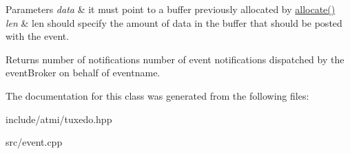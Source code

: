 \begin{DoxyParams}{Parameters}
{\em data} & it must point to a buffer previously allocated by \hyperlink{classatmi_1_1tuxedo_a44e77e3e6216a8c3fb8be33d5d8fed93}{allocate()} \\
\hline
{\em len} & len should specify the amount of data in the buffer that should be posted with the event.\\
\hline
\end{DoxyParams}
\begin{DoxyReturn}{Returns}
number of notifications number of event notifications dispatched by the event\+Broker on behalf of eventname. 
\end{DoxyReturn}


The documentation for this class was generated from the following files\+:\begin{DoxyCompactItemize}
\item 
include/atmi/tuxedo.\+hpp\item 
src/event.\+cpp\end{DoxyCompactItemize}
